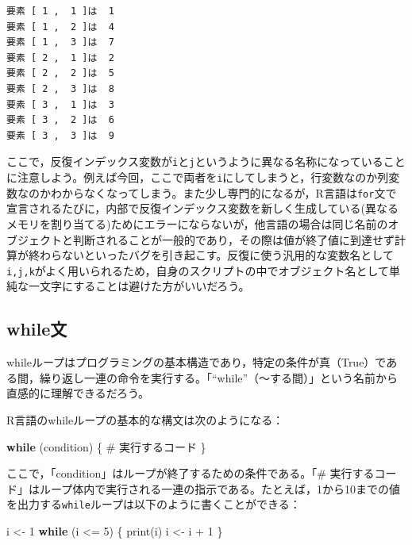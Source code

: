 \documentclass[
  a4paper,
]{ltjsbook}
\newenvironment{Shaded}{\begin{snugshade}}{\end{snugshade}}
\newcommand{\CommentTok}[1]{\textcolor[rgb]{0.37,0.37,0.37}{#1}}
\newcommand{\ControlFlowTok}[1]{\textcolor[rgb]{0.00,0.23,0.31}{\textbf{#1}}}
\newcommand{\DecValTok}[1]{\textcolor[rgb]{0.68,0.00,0.00}{#1}}
\newcommand{\FunctionTok}[1]{\textcolor[rgb]{0.28,0.35,0.67}{#1}}
\newcommand{\NormalTok}[1]{\textcolor[rgb]{0.00,0.23,0.31}{#1}}
\newcommand{\OtherTok}[1]{\textcolor[rgb]{0.00,0.23,0.31}{#1}}
\newcommand{\SpecialCharTok}[1]{\textcolor[rgb]{0.37,0.37,0.37}{#1}}
\begin{document}
\begin{verbatim}
要素 [ 1 ,  1 ]は  1 
要素 [ 1 ,  2 ]は  4 
要素 [ 1 ,  3 ]は  7 
要素 [ 2 ,  1 ]は  2 
要素 [ 2 ,  2 ]は  5 
要素 [ 2 ,  3 ]は  8 
要素 [ 3 ,  1 ]は  3 
要素 [ 3 ,  2 ]は  6 
要素 [ 3 ,  3 ]は  9 
\end{verbatim}

ここで，反復インデックス変数が\texttt{i}と\texttt{j}というように異なる名称になっていることに注意しよう。例えば今回，ここで両者を\texttt{i}にしてしまうと，行変数なのか列変数なのかわからなくなってしまう。また少し専門的になるが，R言語は\texttt{for}文で宣言されるたびに，内部で反復インデックス変数を新しく生成している(異なるメモリを割り当てる)ためにエラーにならないが，他言語の場合は同じ名前のオブジェクトと判断されることが一般的であり，その際は値が終了値に到達せず計算が終わらないといったバグを引き起こす。反復に使う汎用的な変数名として\texttt{i,j,k}がよく用いられるため，自身のスクリプトの中でオブジェクト名として単純な一文字にすることは避けた方がいいだろう。

\subsection{while文}\label{whileux6587}

whileループはプログラミングの基本構造であり，特定の条件が真（True）である間，繰り返し一連の命令を実行する。「``while''（～する間）」という名前から直感的に理解できるだろう。

R言語のwhileループの基本的な構文は次のようになる：

\begin{Shaded}
\begin{Highlighting}[]
\ControlFlowTok{while}\NormalTok{ (condition) \{}
    \CommentTok{\# 実行するコード}
\NormalTok{\}}
\end{Highlighting}
\end{Shaded}

ここで，「condition」はループが終了するための条件である。「\#
実行するコード」はループ体内で実行される一連の指示である。たとえば，1から10までの値を出力する\texttt{while}ループは以下のように書くことができる：

\begin{Shaded}
\begin{Highlighting}[]
\NormalTok{i }\OtherTok{\textless{}{-}} \DecValTok{1}
\ControlFlowTok{while}\NormalTok{ (i }\SpecialCharTok{\textless{}=} \DecValTok{5}\NormalTok{) \{}
  \FunctionTok{print}\NormalTok{(i)}
\NormalTok{  i }\OtherTok{\textless{}{-}}\NormalTok{ i }\SpecialCharTok{+} \DecValTok{1}
\NormalTok{\}}
\end{Highlighting}
\end{Shaded}
\end{document}

